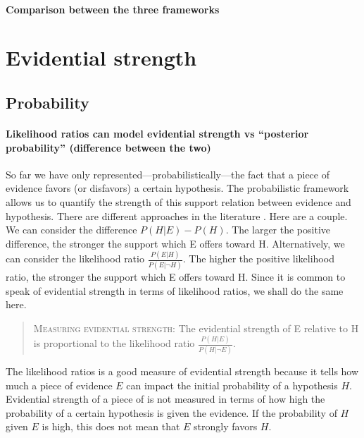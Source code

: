 \documentclass[10pt]{article}
\begin{document}
\paragraph{Comparison between the three frameworks}




\section{Evidential strength}

\subsection{Probability}


\paragraph{Likelihood ratios can model evidential strength vs ``posterior probability'' (difference between the two)}

So far we have only represented---probabilistically---the fact that a piece of 
evidence favors (or disfavors) a certain hypothesis. The probabilistic framework 
allows us to quantify the strength of this support relation between evidence and hypothesis. 
There are different approaches in the literature \citep{Fitelson2006}. Here are a couple. 
We can consider the difference $P(H|E) - P(H)$. The larger the positive difference, the stronger the support 
which E offers toward H. Alternatively, we can consider the likelihood ratio $\frac{P(E|H)}{P(E| \neg H)}$. 
The higher the positive likelihood ratio, the stronger the support which E offers toward H. 
Since it is common to speak of evidential strength in terms of likelihood ratios, 
we shall do the same here. 
%
\begin{quote}
\textsc{Measuring evidential strength:} The evidential strength of E relative to H is proportional to 
the likelihood ratio $\frac{P(H|E)}{P(H|\neg E)}$. 
\end{quote}
%
The likelihood ratios is a good measure of evidential strength because it tells how much a piece 
of evidence $E$ can impact the initial probability of a hypothesis $H$. Evidential strength of a 
piece of is not measured in terms of how high  the probability of a certain hypothesis 
is given the evidence. If the probability of $H$ given $E$ is high, this does 
not mean that $E$ strongly favors $H$. 
\end{document}
